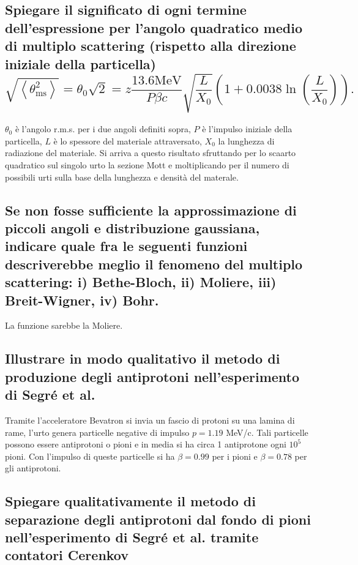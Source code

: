 \subsection[]{Spiegare il significato di ogni termine dell'espressione per l’angolo quadratico medio di multiplo scattering (rispetto alla direzione iniziale della particella)
\[
\sqrt{\left<\theta^2_{\text{ms}}\right>}=\theta_0\sqrt{2}=z\frac{13.6\text{MeV}}{P\beta c}\sqrt{\frac{L}{X_0}}\left(1+0.0038\ln\left(\frac{L}{X_0}\right)  \right)  
.\] 
}\label{sec:4.a.30}
$\theta_0$ è l'angolo r.m.s. per i due angoli definiti sopra, $P$ è l'impulso iniziale della particella, $L$ è lo spessore del materiale attraversato,  $X_0$ la lunghezza di radiazione del materiale. Si arriva a questo risultato sfruttando per lo scaarto quadratico sul singolo urto la sezione Mott e moltiplicando per il numero di possibili urti sulla base della lunghezza e densità del materale.

\subsection[]{Se non fosse sufficiente la approssimazione di piccoli angoli e distribuzione gaussiana, indicare quale fra le seguenti funzioni descriverebbe meglio il fenomeno del multiplo scattering: i) Bethe-Bloch, ii) Moliere, iii) Breit-Wigner, iv) Bohr.
}\label{sec:4.a.31}
La funzione sarebbe la Moliere.

\subsection[]{Illustrare in modo qualitativo il metodo di produzione degli antiprotoni nell’esperimento di Segré et al.
}\label{sec:4.a.32}
Tramite l'acceleratore Bevatron si invia un fascio di protoni su una lamina di rame, l'urto genera particelle negative di impulso $p= 1.19$ MeV/c.
Tali particelle possono essere antiprotoni o pioni e in media si ha circa 1 antiprotone ogni $10^{5}$ pioni. Con l'impulso di queste particelle si ha $\beta = 0.99$ per i pioni e $\beta=0.78$ per gli antiprotoni.

\subsection[]{Spiegare qualitativamente il metodo di separazione degli antiprotoni dal fondo di pioni nell’esperimento di Segré et al. tramite contatori Cerenkov
}\label{sec:4.a.33}

